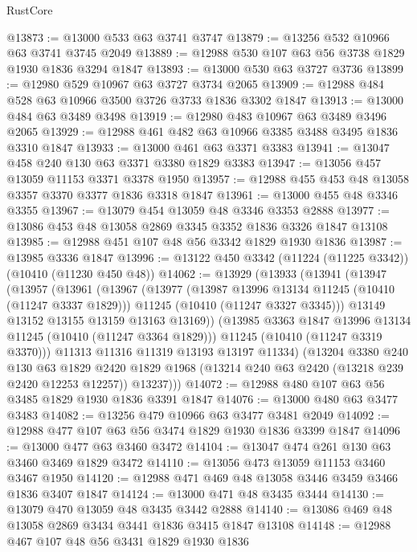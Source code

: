 \begin{lexlean}{RustCore}
\begin{coremodule}
@13873 := @13000 @533 @63 @3741 @3747
@13879 := @13256 @532 @10966 @63 @3741 @3745 @2049
@13889 := @12988 @530 @107 @63 @56 @3738 @1829 @1930 @1836 @3294 @1847
@13893 := @13000 @530 @63 @3727 @3736
@13899 := @12980 @529 @10967 @63 @3727 @3734 @2065
@13909 := @12988 @484 @528 @63 @10966 @3500 @3726 @3733 @1836 @3302 @1847
@13913 := @13000 @484 @63 @3489 @3498
@13919 := @12980 @483 @10967 @63 @3489 @3496 @2065
@13929 := @12988 @461 @482 @63 @10966 @3385 @3488 @3495 @1836 @3310 @1847
@13933 := @13000 @461 @63 @3371 @3383
@13941 := @13047 @458 @240 @130 @63 @3371 @3380 @1829 @3383
@13947 := @13056 @457 @13059 @11153 @3371 @3378 @1950
@13957 := @12988 @455 @453 @48 @13058 @3357 @3370 @3377 @1836 @3318 @1847
@13961 := @13000 @455 @48 @3346 @3355
@13967 := @13079 @454 @13059 @48 @3346 @3353 @2888
@13977 := @13086 @453 @48 @13058 @2869 @3345 @3352 @1836 @3326 @1847 @13108
@13985 := @12988 @451 @107 @48 @56 @3342 @1829 @1930 @1836
@13987 := @13985 @3336 @1847
@13996 := @13122 @450 @3342 (@11224 (@11225 @3342)) (@10410 (@11230 @450 @48))
@14062 := @13929
    (@13933
      (@13941
        (@13947
          (@13957
            (@13961
              (@13967
                (@13977
                  (@13987 @13996 @13134 @11245 (@10410 (@11247 @3337 @1829)))
                  @11245
                  (@10410 (@11247 @3327 @3345)))
                @13149
                @13152
                @13155
                @13159
                @13163
                @13169))
            (@13985 @3363 @1847 @13996 @13134 @11245 (@10410 (@11247 @3364 @1829)))
            @11245
            (@10410 (@11247 @3319 @3370)))
          @11313
          @11316
          @11319
          @13193
          @13197
          @11334)
        (@13204
          @3380
          @240
          @130
          @63
          @1829
          @2420
          @1829
          @1968
          (@13214 @240 @63 @2420 (@13218 @239 @2420 @12253 @12257))
          @13237)))
@14072 := @12988 @480 @107 @63 @56 @3485 @1829 @1930 @1836 @3391 @1847
@14076 := @13000 @480 @63 @3477 @3483
@14082 := @13256 @479 @10966 @63 @3477 @3481 @2049
@14092 := @12988 @477 @107 @63 @56 @3474 @1829 @1930 @1836 @3399 @1847
@14096 := @13000 @477 @63 @3460 @3472
@14104 := @13047 @474 @261 @130 @63 @3460 @3469 @1829 @3472
@14110 := @13056 @473 @13059 @11153 @3460 @3467 @1950
@14120 := @12988 @471 @469 @48 @13058 @3446 @3459 @3466 @1836 @3407 @1847
@14124 := @13000 @471 @48 @3435 @3444
@14130 := @13079 @470 @13059 @48 @3435 @3442 @2888
@14140 := @13086 @469 @48 @13058 @2869 @3434 @3441 @1836 @3415 @1847 @13108
@14148 := @12988 @467 @107 @48 @56 @3431 @1829 @1930 @1836

\end{coremodule}
\end{lexlean}
